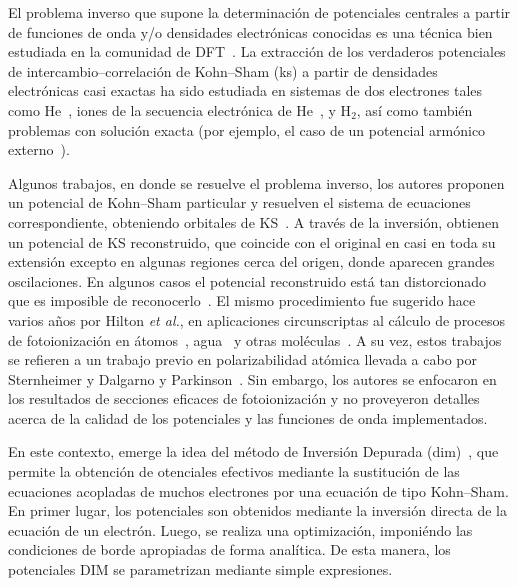 El problema inverso que supone la determinación de potenciales centrales 
a partir de funciones de onda y/o densidades electrónicas conocidas es 
una técnica bien estudiada en la comunidad de 
DFT~\cite{Wu:03,Gaiduk:13,Ryabinkin:15}. La extracción de los verdaderos
potenciales de intercambio--correlación de Kohn--Sham (\acs{ks}) a partir de 
densidades electrónicas casi exactas ha sido estudiada en sistemas de 
dos electrones tales como He~\cite{Mura:97}, iones de la secuencia 
electrónica de He~\cite{Umrigar:94}, y H$_2$\cite{Gritsenko:97,Mura:97},
así como también problemas con solución exacta (por ejemplo, el caso de
un potencial armónico externo~\cite{Filippi:94}).

Algunos trabajos, en donde se resuelve el problema inverso, los autores 
proponen un potencial de Kohn--Sham particular y resuelven el sistema
de ecuaciones correspondiente, obteniendo orbitales de 
KS~\cite{Schipper:97,deSilva:12,Kananenka:13}. A través de la inversión,
obtienen un potencial de KS reconstruido, que coincide con el original
en casi en toda su extensión excepto en algunas regiones cerca del 
origen, donde aparecen grandes oscilaciones. En algunos casos el 
potencial reconstruido está tan distorcionado que es imposible de 
reconocerlo~\cite{Mura:97,Jacob:11}. El mismo procedimiento fue 
sugerido hace varios años por Hilton \textit{et al.}, en aplicaciones
circunscriptas al cálculo de procesos de fotoionización en 
átomos~\cite{Hilton:77,Suzer:77}, agua~\cite{Hilton:79} y otras 
moléculas~\cite{Hilton:80,Crljen:87}. A su vez, estos trabajos se 
refieren a un trabajo previo en polarizabilidad atómica llevada a cabo 
por Sternheimer\cite{Sternheimer:54} y Dalgarno y 
Parkinson~\cite{Dalgarno:59}. Sin embargo, los autores se enfocaron en 
los resultados de secciones eficaces de fotoionización y no proveyeron 
detalles acerca de la calidad de los potenciales y las funciones de 
onda implementados.

En este contexto, emerge la idea del método de Inversión Depurada 
(\acs{dim})~\cite{Mendez:16,Mendez:18}, que permite la obtención de 
otenciales efectivos mediante la sustitución de las ecuaciones acopladas 
de muchos electrones por una ecuación de tipo Kohn--Sham. En primer 
lugar, los potenciales son obtenidos mediante la inversión directa de 
la ecuación de un electrón. Luego, se realiza una optimización, 
imponiéndo las condiciones de borde apropiadas de forma analítica. De 
esta manera, los potenciales DIM se parametrizan mediante simple 
expresiones.


